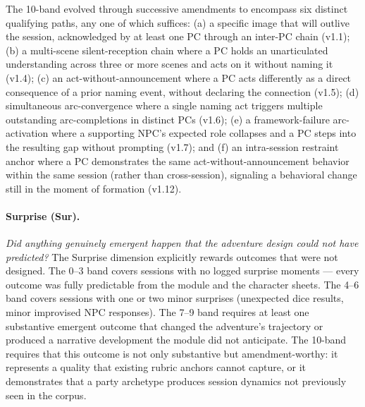 The 10-band evolved through successive amendments to encompass six distinct qualifying
paths, any one of which suffices: (a) a specific image that will outlive the session,
acknowledged by at least one PC through an inter-PC chain (v1.1); (b) a multi-scene
silent-reception chain where a PC holds an unarticulated understanding across three or
more scenes and acts on it without naming it (v1.4); (c) an act-without-announcement
where a PC acts differently as a direct consequence of a prior naming event, without
declaring the connection (v1.5); (d) simultaneous arc-convergence where a single naming
act triggers multiple outstanding arc-completions in distinct PCs (v1.6); (e) a
framework-failure arc-activation where a supporting NPC's expected role collapses and a
PC steps into the resulting gap without prompting (v1.7); and (f) an intra-session
restraint anchor where a PC demonstrates the same act-without-announcement behavior
within the same session (rather than cross-session), signaling a behavioral change
still in the moment of formation (v1.12).

\paragraph{Surprise (Sur).}
\textit{Did anything genuinely emergent happen that the adventure design could not have
predicted?}
The Surprise dimension explicitly rewards outcomes that were not designed. The 0--3
band covers sessions with no logged surprise moments --- every outcome was fully
predictable from the module and the character sheets. The 4--6 band covers sessions
with one or two minor surprises (unexpected dice results, minor improvised NPC
responses). The 7--9 band requires at least one substantive emergent outcome that
changed the adventure's trajectory or produced a narrative development the module
did not anticipate. The 10-band requires that this outcome is not only substantive
but amendment-worthy: it represents a quality that existing rubric anchors cannot
capture, or it demonstrates that a party archetype produces session dynamics not
previously seen in the corpus.

